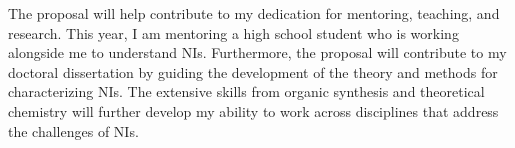 \documentclass[11pt]{article}
\begin{document}
The proposal will help contribute to my dedication for mentoring, teaching, and research. 
This year, I am mentoring a high school student who is working alongside me to
understand NIs. Furthermore, the proposal will contribute to
my doctoral dissertation by guiding the development of the theory and methods for characterizing
NIs. The extensive skills from organic synthesis and theoretical chemistry will further
develop my ability to work across disciplines that address the challenges of NIs.


\printbibliography
\end{document}
